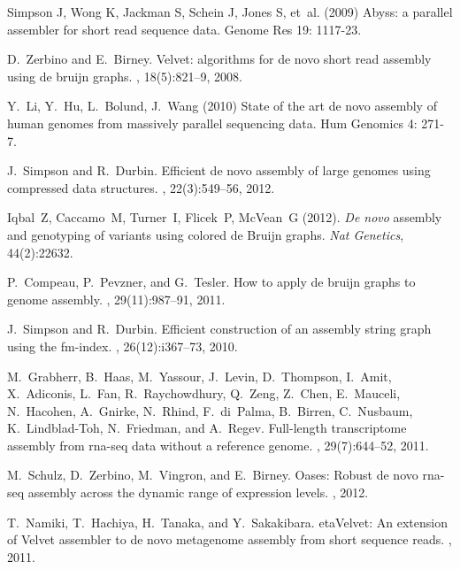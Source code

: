 \documentclass{pnastwo}
\begin{document}
\begin{article}
\begin{thebibliography}{20}
Simpson J, Wong K, Jackman S, Schein J, Jones S, et~al. (2009)
\newblock Abyss: a parallel assembler for short read sequence data.
\newblock Genome Res 19: 1117-23.

D.~Zerbino and E.~Birney.
\newblock Velvet: algorithms for de novo short read assembly using de bruijn
  graphs.
, 18(5):821--9, 2008.

Y.~Li, Y.~Hu, L.~Bolund, J.~Wang (2010)
\newblock State of the art de novo assembly of human genomes from massively parallel sequencing data.
\newblock Hum Genomics 4: 271-7.

J.~Simpson and R.~Durbin.
\newblock Efficient de novo assembly of large genomes using compressed data
  structures.
, 22(3):549--56, 2012.

 Iqbal~Z, Caccamo~M, Turner~I, Flicek~P, McVean~G (2012).  {\it De novo} assembly and genotyping of variants using
colored de Bruijn graphs.  {\it Nat Genetics}, 44(2):22632.

P.~Compeau, P.~Pevzner, and G.~Tesler.
\newblock How to apply de bruijn graphs to genome assembly.
, 29(11):987--91, 2011.

J.~Simpson and R.~Durbin.
\newblock Efficient construction of an assembly string graph using the
  fm-index.
, 26(12):i367--73, 2010.

M.~Grabherr, B.~Haas, M.~Yassour, J.~Levin, D.~Thompson, I.~Amit, X.~Adiconis,
  L.~Fan, R.~Raychowdhury, Q.~Zeng, Z.~Chen, E.~Mauceli, N.~Hacohen, A.~Gnirke,
  N.~Rhind, F.~di~Palma, B.~Birren, C.~Nusbaum, K.~Lindblad-Toh, N.~Friedman,
  and A.~Regev.
\newblock Full-length transcriptome assembly from rna-seq data without a
  reference genome.
, 29(7):644--52, 2011.

M.~Schulz, D.~Zerbino, M.~Vingron, and E.~Birney.
\newblock Oases: Robust de novo rna-seq assembly across the dynamic range of
  expression levels.
, 2012.

T.~Namiki, T.~Hachiya, H.~Tanaka, and Y.~Sakakibara.
eta{V}elvet: {A}n extension of {V}elvet assembler to de novo
  metagenome assembly from short sequence reads.
, 2011.


\end{thebibliography}
\end{article}
\end{document}

